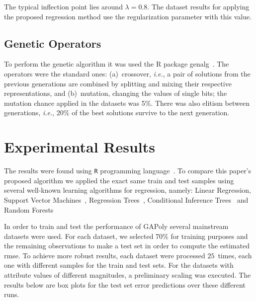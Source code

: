 \documentclass[draft,authoryear,3p,times,twocolumn]{elsarticle}
\begin{document}
The typical inflection point lies around $\lambda = 0.8$. The dataset results for applying the proposed regression method use the regularization parameter with this value.

\subsection{Genetic Operators}

To perform the genetic algorithm it was used the R package genalg~\citep{willighage2012genalg}. The operators were the standard ones: (a)~crossover, \emph{i.e.}, a pair of solutions from the previous generations are combined by splitting and mixing their respective representations, and (b)~mutation, changing the values of single bits; the mutation chance applied in the datasets was 5\%. There was also elitism between generations, \emph{i.e.}, 20\% of the best solutions survive to the next generation.

\section{Experimental Results}

The results were found using \texttt{R} programming language~\citep{R}. To compare this paper's proposed algorithm we applied the exact same train and test samples using several well-known learning algorithms for regression, namely: Linear Regression, Support Vector Machines~\citep{Meyer12}, Regression Trees~\citep{Therneau13}, Conditional Inference Trees~\citep{Hothorn06, Strobl07, Strobl08} and Random Forests~\citep{Liaw02}

In order to train and test the performance of \ac{GAPoly} several mainstream datasets were used. For each dataset, we selected 70\% for training purposes and the remaining observations to make a test set in order to compute the estimated \ac{rmse}. To achieve more robust results, each dataset were processed $25$~times, each one with different samples for the train and test sets. For the datasets with attribute values of different magnitudes, a preliminary scaling was executed. The results below are box plots for the test set error predictions over these different runs.
\end{document}
